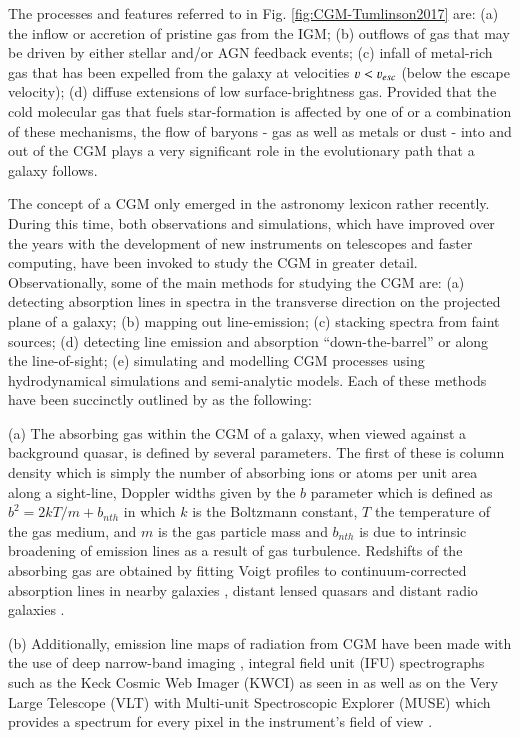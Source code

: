 The processes and features referred to in Fig. \ref{fig:CGM-Tumlinson2017} are: (a) the inflow or accretion of pristine gas from the IGM; (b) outflows of gas that may be driven by either stellar and/or AGN feedback events; (c) infall of metal-rich gas that has been expelled from the galaxy at velocities $\varv < \varv_{esc}$ (below the escape velocity); (d) diffuse extensions of low surface-brightness gas. Provided that the cold molecular gas that fuels star-formation is affected by one of or a combination of these mechanisms, the flow of baryons - gas as well as metals or dust - into and out of the CGM plays a very significant role in the evolutionary path that a galaxy follows.

The concept of a CGM only emerged in the astronomy lexicon rather recently. During this time, both observations and simulations, which have improved over the years with the development of new instruments on telescopes and faster computing, have been invoked to study the CGM in greater detail. Observationally, some of the main methods for studying the CGM are: (a) detecting absorption lines in spectra in the transverse direction on the projected plane of a galaxy; (b) mapping out line-emission; (c) stacking spectra from faint sources; (d) detecting line emission and absorption ``down-the-barrel'' or along the line-of-sight; (e) simulating and modelling CGM processes using hydrodynamical simulations and semi-analytic models. Each of these methods have been succinctly outlined by \citet{tumlinson2017} as the following:

(a) The absorbing gas within the CGM of a galaxy, when viewed against a background quasar, is defined by several parameters. The first of these is column density which is simply the number of absorbing ions or atoms per unit area along a sight-line, Doppler widths given by the $b$ parameter which is defined as $b^2 = 2kT/m + b_{nth}$ in which $k$ is the Boltzmann constant, $T$ the temperature of the gas medium, and $m$ is the gas particle mass and $b_{nth}$ is due to intrinsic broadening of emission lines as a result of gas turbulence. Redshifts of the absorbing gas are obtained by fitting Voigt profiles to continuum-corrected absorption lines in nearby galaxies \citep[e.g.,][]{Lehner2015,Bowen2016}, distant lensed quasars \citep{RauchHaehnelt2011,Rubin2015} and distant radio galaxies \citep{vanojik1996,wilman2003}. 

(b) Additionally, emission line maps of radiation from CGM have been made with the use of deep narrow-band imaging \citep{Prescott2015,Arrigoni-Battaia2016}, integral field unit (IFU) spectrographs such as the Keck Cosmic Web Imager (KWCI) as seen in \citet{Cai2018} as well as on the Very Large Telescope (VLT) with Multi-unit Spectroscopic Explorer (MUSE) which provides a spectrum for every pixel in the instrument's field of view \citep[e.g.,][]{Cantalupo2014}. 

